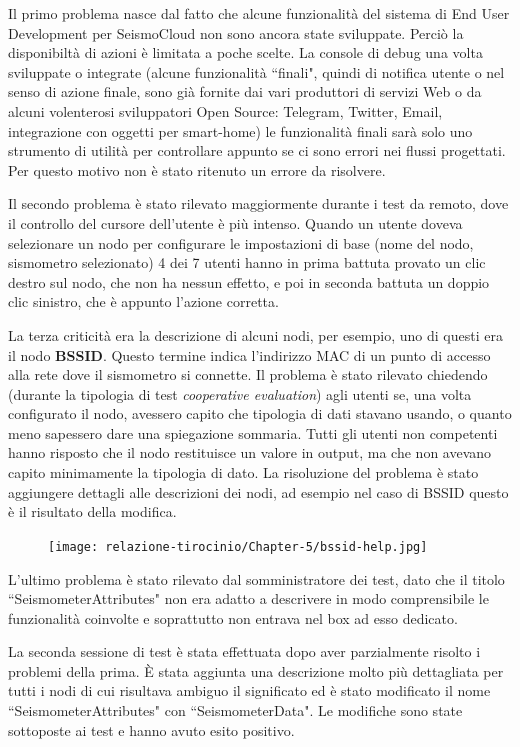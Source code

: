 \documentclass[a4paper,10pt]{memoir}
\begin{document}
Il primo problema nasce dal fatto che alcune funzionalità del sistema di End User Development per SeismoCloud non sono ancora state sviluppate. Perciò la disponibiltà di azioni è limitata a poche scelte. La console di debug una volta sviluppate o integrate (alcune funzionalità ``finali", quindi di notifica utente o nel senso di azione finale, sono già fornite dai vari produttori di servizi Web o da alcuni volenterosi sviluppatori Open Source: Telegram, Twitter, Email, integrazione con oggetti per smart-home) le funzionalità finali sarà solo uno strumento di utilità per controllare appunto se ci sono errori nei flussi progettati. Per questo motivo non è stato ritenuto un errore da risolvere.

Il secondo problema è stato rilevato maggiormente durante i test da remoto, dove il controllo del cursore dell'utente è più intenso. Quando un utente doveva selezionare un nodo per configurare le impostazioni di base (nome del nodo, sismometro selezionato) 4 dei 7 utenti hanno in prima battuta provato un clic destro sul nodo, che non ha nessun effetto, e poi in seconda battuta un doppio clic sinistro, che è appunto l'azione corretta.

La terza criticità era la descrizione di alcuni nodi, per esempio, uno di questi era il nodo \textbf{BSSID}. Questo termine indica l'indirizzo MAC di un punto di accesso alla rete dove il sismometro si connette.
Il problema è stato rilevato chiedendo (durante la tipologia di test \textit{cooperative evaluation}) agli utenti se, una volta configurato il nodo, avessero capito che tipologia di dati stavano usando, o quanto meno sapessero dare una spiegazione sommaria.
Tutti gli utenti non competenti hanno risposto che il nodo restituisce un valore in output, ma che non avevano capito minimamente la tipologia di dato.
La risoluzione del problema è stato aggiungere dettagli alle descrizioni dei nodi, ad esempio nel caso di BSSID questo è il risultato della modifica.
\begin{figure}[ht]
    \centering
    \texttt{[image: relazione-tirocinio/Chapter-5/bssid-help.jpg]}
    \label{fig:bssid-help}
\end{figure}

L'ultimo problema è stato rilevato dal somministratore dei test, dato che il titolo ``SeismometerAttributes" non era adatto a descrivere in modo comprensibile le funzionalità coinvolte e soprattutto non entrava nel box ad esso dedicato.

La seconda sessione di test è stata effettuata dopo aver parzialmente risolto i problemi della prima. È stata aggiunta una descrizione molto più dettagliata per tutti i nodi di cui risultava ambiguo il significato ed è stato modificato il nome ``SeismometerAttributes" con ``SeismometerData". Le modifiche sono state sottoposte ai test e hanno avuto esito positivo.
\end{document}
